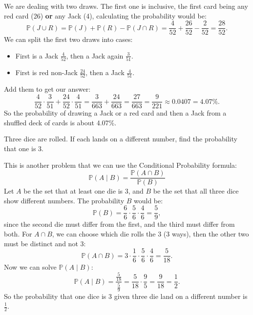 \documentclass{jhwhw}
\begin{document}
    \solution
        We are dealing with two draws. The first one is inclusive, the first card being any red card (26) \textbf{or} any Jack (4),
        calculating the probability would be:
        \[
            \mathbb{P}(J \cup R) = \mathbb{P}(J)+\mathbb{P}(R)-\mathbb{P}(J \cap R) = \frac{4}{52} + \frac{26}{52} - \frac{2}{52} = \frac{28}{52}.
        \]
        We can split the first two draws into cases:
        \begin{itemize}
            \item First is a Jack \(\frac{4}{52}\), then a Jack again \(\frac{3}{51}\).
            \item First is red non-Jack \(\frac{24}{52}\), then a Jack \(\frac{4}{51}\). 
        \end{itemize}
        Add them to get our answer:
        \[
            \frac{4}{52} \cdot \frac{3}{51} + \frac{24}{52} \cdot \frac{4}{51} = \frac{3}{663} + \frac{24}{663} = \frac{27}{663} = \frac{9}{221} \approx 0.0407 = 4.07\%.
        \]
        So the probability of drawing a Jack or a red card and then a Jack from a shuffled deck of cards is about 4.07\%.

    
    \problem{}
        Three dice are rolled. If each lands on a different number, find the probability that one is 3.
    
    \solution
        This is another problem that we can use the Conditional Probability formula:
        \[
            \mathbb{P}(A \mid B) = \frac{\mathbb{P}(A \cap B)}{\mathbb{P}(B)}
        \]
        Let \(A\)  be the set that at least one die is 3, and \(B\) be the set that all three dice show different numbers.
        The probability \(B\) would be:
        \[
            \mathbb{P}(B) = \frac{6}{6} \cdot \frac{5}{6} \cdot \frac{4}{6} = \frac{5}{9},
        \]
        since the second die must differ from the first, and the third must differ from both. For \(A \cap B\), we can
        choose which die rolls the 3 (3 ways), then the other two must be distinct and not 3:
        \[
            \mathbb{P}(A \cap B) = 3 \cdot \frac{1}{6} \cdot \frac{5}{6} \cdot \frac{4}{6} = \frac{5}{18}.
        \]
        Now we can solve \(\mathbb{P}(A \mid B)\): 
        \[
            \mathbb{P}(A \mid B) = \frac{\frac{5}{18}}{\frac{5}{9}} = \frac{5}{18} \cdot \frac{9}{5} = \frac{9}{18} = \frac{1}{2}.
        \]
        So the probability that one dice is 3 given three die land on a different number is \(\frac{1}{2}\). 
\end{document}
